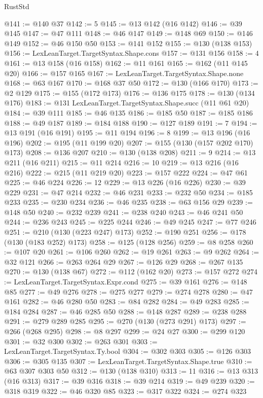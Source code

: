 \begin{lexlean}{RustStd}
\begin{coremodule}
@141 := @140 @37
@142 := 5
@145 := @13 @142 (@16 @142)
@146 := @39 @145
@147 := @47 @111
@148 := @46 @147
@149 := @148 @69
@150 := @146 @149
@152 := @46 @150 @50
@153 := @141 @152
@155 := @130 (@138 @153)
@156 := LexLeanTarget.TargetSyntax.Shape.cons
@157 := @131 @156
@158 := 4
@161 := @13 @158 (@16 @158)
@162 := @11 @161
@165 := @162 (@11 @145 @20)
@166 := @157 @165
@167 := LexLeanTarget.TargetSyntax.Shape.none
@168 := @63 @167
@170 := @168 @37 @50
@172 := @130 (@166 @170)
@173 := @2 @129
@175 := @155 (@172 @173)
@176 := @136 @175
@178 := @130 (@134 @176)
@183 := @131 LexLeanTarget.TargetSyntax.Shape.succ (@11 @61 @20)
@184 := @39 @111
@185 := @46 @135
@186 := @185 @50
@187 := @185 @186
@188 := @49 @187
@189 := @184 @188
@190 := @127 @189
@191 := 7
@194 := @13 @191 (@16 @191)
@195 := @11 @194
@196 := 8
@199 := @13 @196 (@16 @196)
@202 := @195 (@11 @199 @20)
@207 := @155 (@130 (@157 @202 @170) @173)
@208 := @136 @207
@210 := @130 (@138 @208)
@211 := 9
@214 := @13 @211 (@16 @211)
@215 := @11 @214
@216 := 10
@219 := @13 @216 (@16 @216)
@222 := @215 (@11 @219 @20)
@223 := @157 @222
@224 := @47 @61
@225 := @46 @224
@226 := 12
@229 := @13 @226 (@16 @226)
@230 := @39 @229
@231 := @47 @214
@232 := @46 @231
@233 := @232 @50
@234 := @185 @233
@235 := @230 @234
@236 := @46 @235
@238 := @63 @156 @29
@239 := @148 @50
@240 := @232 @239
@241 := @238 @240
@243 := @46 @241 @50
@244 := @236 @243
@245 := @225 @244
@246 := @49 @245
@247 := @77 @246
@251 := @210 (@130 (@223 @247) @173)
@252 := @190 @251
@256 := @178 (@130 (@183 @252) @173)
@258 := @125 (@128 @256)
@259 := @8 @258
@260 := @107 @20
@261 := @106 @260
@262 := @19 @261
@263 := @9 @262
@264 := @32 @121
@266 := @263 @264 @29
@267 := @126 @29
@268 := @267 @135
@270 := @130 (@138 @67)
@272 := @112 (@162 @20)
@273 := @157 @272
@274 := LexLeanTarget.TargetSyntax.Expr.cond
@275 := @39 @161
@276 := @148 @85
@277 := @49 @276
@278 := @275 @277
@279 := @274 @278
@280 := @47 @161
@282 := @46 @280 @50
@283 := @84 @282
@284 := @49 @283
@285 := @184 @284
@287 := @46 @285 @50
@288 := @148 @287
@289 := @238 @288
@291 := @279 @289 @285
@295 := @270 (@130 (@273 @291) @173)
@297 := @266 (@268 @295)
@298 := @8 @297
@299 := @24 @27
@300 := @299 @120
@301 := @32 @300
@302 := @263 @301
@303 := LexLeanTarget.TargetSyntax.Ty.bool
@304 := @302 @303
@305 := @126 @303
@306 := @305 @135
@307 := LexLeanTarget.TargetSyntax.Shape.true
@310 := @63 @307 @303 @50
@312 := @130 (@138 @310)
@313 := 11
@316 := @13 @313 (@16 @313)
@317 := @39 @316
@318 := @39 @214
@319 := @49 @239
@320 := @318 @319
@322 := @46 @320 @85
@323 := @317 @322
@324 := @274 @323

\end{coremodule}
\end{lexlean}
